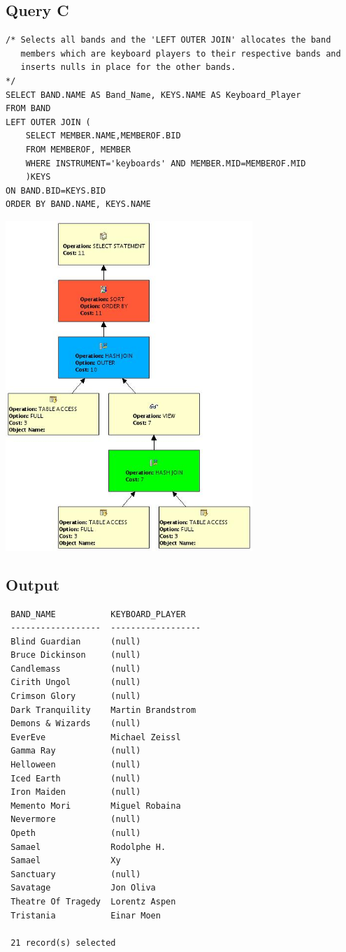\documentclass{report}
\begin{document}
\subsection*{Query C}
\begin{verbatim}
/* Selects all bands and the 'LEFT OUTER JOIN' allocates the band
   members which are keyboard players to their respective bands and
   inserts nulls in place for the other bands.
*/ 
SELECT BAND.NAME AS Band_Name, KEYS.NAME AS Keyboard_Player
FROM BAND
LEFT OUTER JOIN (
    SELECT MEMBER.NAME,MEMBEROF.BID
    FROM MEMBEROF, MEMBER
    WHERE INSTRUMENT='keyboards' AND MEMBER.MID=MEMBEROF.MID
    )KEYS
ON BAND.BID=KEYS.BID
ORDER BY BAND.NAME, KEYS.NAME
\end{verbatim}
\includegraphics[width=0.7\textwidth]{Q4}
\subsection*{Output}
\begin{verbatim}
 BAND_NAME           KEYBOARD_PLAYER    
 ------------------  ------------------ 
 Blind Guardian      (null)             
 Bruce Dickinson     (null)             
 Candlemass          (null)             
 Cirith Ungol        (null)             
 Crimson Glory       (null)             
 Dark Tranquility    Martin Brandstrom  
 Demons & Wizards    (null)             
 EverEve             Michael Zeissl     
 Gamma Ray           (null)             
 Helloween           (null)             
 Iced Earth          (null)             
 Iron Maiden         (null)             
 Memento Mori        Miguel Robaina     
 Nevermore           (null)             
 Opeth               (null)             
 Samael              Rodolphe H.        
 Samael              Xy                 
 Sanctuary           (null)             
 Savatage            Jon Oliva          
 Theatre Of Tragedy  Lorentz Aspen      
 Tristania           Einar Moen         

 21 record(s) selected
\end{verbatim}
\end{document}
